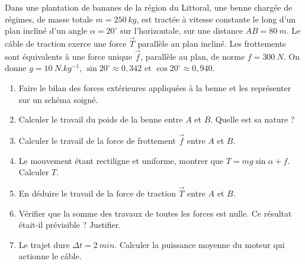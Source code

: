 \documentclass[11pt]{article}
\begin{document}
\begin{exercice}
Dans une plantation de bananes de la région du Littoral, une benne chargée de régimes, de masse totale $m = \SI{250}{kg}$, est tractée à vitesse constante le long d'un plan incliné d'un angle $\alpha = 20^{\circ}$ sur l'horizontale, sur une distance $AB = \SI{80}{m}$. Le câble de traction exerce une force $\vec{T}$ parallèle au plan incliné. Les frottements sont équivalents à une force unique $\vec{f}$, parallèle au plan, de norme $f = \SI{300}{N}$. On donne $g = \SI{10}{N.kg^{-1}}$, $\sin 20^{\circ} \approx 0,342$ et $\cos 20^{\circ} \approx 0,940$.
\begin{enumerate}
\item Faire le bilan des forces extérieures appliquées à la benne et les représenter sur un schéma soigné.
\item Calculer le travail du poids de la benne entre $A$ et $B$. Quelle est sa nature ?
\item Calculer le travail de la force de frottement $\vec{f}$ entre $A$ et $B$.
\item Le mouvement étant rectiligne et uniforme, montrer que $T = mg\sin\alpha + f$. Calculer $T$.
\item En déduire le travail de la force de traction $\vec{T}$ entre $A$ et $B$.
\item Vérifier que la somme des travaux de toutes les forces est nulle. Ce résultat était-il prévisible ? Justifier.
\item Le trajet dure $\Delta t = \SI{2}{min}$. Calculer la puissance moyenne du moteur qui actionne le câble.
\end{enumerate}
\end{exercice}
\end{document}
